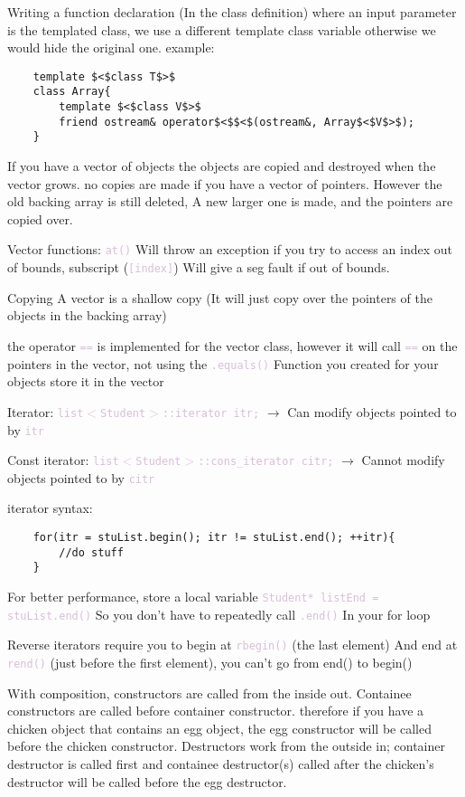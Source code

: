 \documentclass{article}
\newcommand{\code}[1]{\textcolor{Thistle}{\texttt{#1}}}
\begin{document}
{Writing a function declaration (In the class definition) where an input parameter is the templated class, we use a different template class variable otherwise we would hide the original one. example: 
\begin{verbatim}
    template $<$class T$>$
    class Array{
        template $<$class V$>$
        friend ostream& operator$<$$<$(ostream&, Array$<$V$>$);
    }
\end{verbatim}

If you have a vector of objects the objects are copied and destroyed when the vector grows. no copies are made if you have a vector of pointers. However the old backing array is still deleted, A new larger one is made, and the pointers are copied over.

Vector functions: \code{at()} Will throw an exception if you try to access an index out of bounds, subscript (\code{[index]}) Will give a seg fault if out of bounds.

Copying A vector is a shallow copy (It will just copy over the pointers of the objects in the backing array)

the operator \code{==} is implemented for the vector class, however it will call \code{==} on the pointers in the vector, not using the \code{.equals()} Function you created for your objects store it in the vector 

Iterator: \code{list$<$Student$>$::iterator itr;} $\rightarrow$ Can modify objects pointed to by \code{itr}

Const iterator: \code{list$<$Student$>$::cons\_iterator citr;} $\rightarrow$ Cannot modify objects pointed to by \code{citr}

iterator syntax:
\begin{verbatim}
    for(itr = stuList.begin(); itr != stuList.end(); ++itr){
        //do stuff
    }
\end{verbatim}

For better performance, store a local variable \code{Student* listEnd = stuList.end()} So you don't have to repeatedly call \code{.end()} In your for loop 

Reverse iterators require you to begin at \code{rbegin()} (the last element) And end at \code{rend()} (just before the first element), you can't go from end() to begin()

With composition, constructors are called from the inside out. Containee constructors are called before container constructor. therefore if you have a chicken object that contains an egg object, the egg constructor will be called before the chicken constructor. Destructors work from the outside in; container destructor is called first and containee destructor(s) called after the chicken's destructor will be called before the egg destructor. 

}
\end{document}
